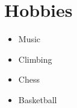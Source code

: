 \documentclass[9.5pt]{article}
\begin{document}
\begin{minipage}[t]{0.305\textwidth}
\section*{\large\bfseries\color{accent}Hobbies}
\vspace{-2pt}
\small
\begin{itemize}
  \item Music
  \item Climbing
  \item Chess
  \item Basketball
\end{itemize}

\end{minipage}
\end{document}
